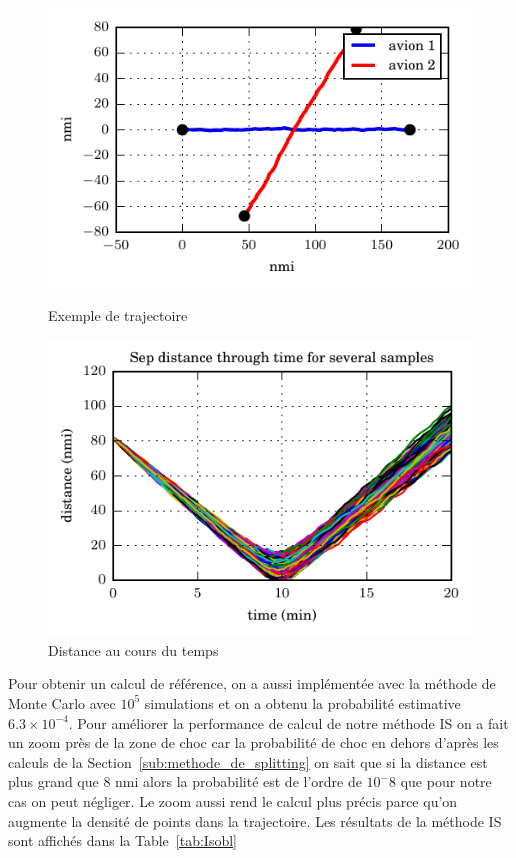 \documentclass[a4paper, 12pt,twoside]{article}
\numberwithin{equation}{subsection}
\newlength{\mylength}
\begin{document}
	\begin{figure}[htbp]
		\centering
		\begin{minipage}[b]{\mylength}
			\includegraphics[width=\textwidth]{Images/Script_6_1}
			\caption{Exemple de trajectoire}
			\label{fig:Croiss}
		\end{minipage}
		\begin{minipage}[b]{\mylength}
			\includegraphics[width=\textwidth]{Images/Script_6_3}
			\caption{Distance au cours du temps}
			\label{fig:dist}
		\end{minipage}
	\end{figure}
	
	Pour obtenir un calcul de référence, on a aussi implémentée avec la méthode de Monte Carlo avec $10^5$ simulations et on a obtenu la probabilité estimative $6.3\times 10^{-4}$. Pour améliorer la performance de calcul de notre méthode IS on a fait un zoom près de la zone de choc car la probabilité de choc en dehors d'après les calculs de la Section~\ref{sub:methode_de_splitting} on sait que si la distance est plus grand que 8 nmi alors la probabilité est de l'ordre de $10^-8$ que pour notre cas on peut négliger. Le zoom aussi rend le calcul plus précis parce qu'on augmente la densité de points dans la trajectoire. Les résultats de la méthode IS sont affichés dans la Table~\ref{tab:Isobl}
	
\end{document}
